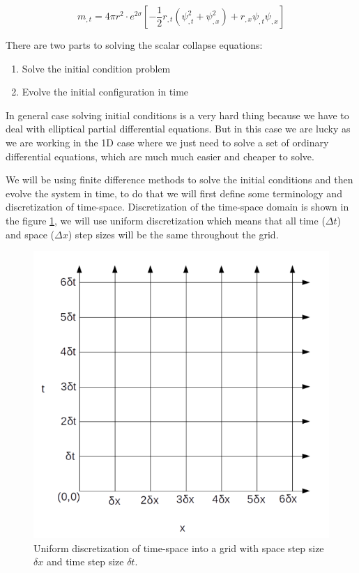 \begin{equation}
    m_{, t}=4 \pi r^{2} \cdot e^{2 \sigma}\left[-\frac{1}{2} r_{, t}\left(\psi_{, t}^{2}+\psi_{, x}^{2}\right)+r_{, x} \psi_{, t} \psi_{, x}\right]
    \label{eqn:m_chap3}
\end{equation}

There are two parts to solving the scalar collapse equations:
\begin{enumerate}
    \item Solve the initial condition problem
    \item Evolve the initial configuration in time
\end{enumerate}

In general case solving initial conditions is a very hard thing because we have to deal with elliptical partial differential equations. But in this case we are lucky as we are working in the 1D case where we just need to solve a set of ordinary differential equations, which are much much easier and cheaper to solve.

We will be using finite difference methods to solve the initial conditions and then evolve the system in time, to do that we will first define some terminology and discretization of time-space.  Discretization of the time-space domain is shown in the figure \ref{fig:grid}, we will use uniform discretization which means that all time ($\Delta t$) and space ($\Delta x$) step sizes will be the same throughout the grid.



\begin{figure}[hbt!]
    \centering
    \includegraphics[width=\textwidth]{images/grid.png}
    \caption{Uniform discretization of time-space into a grid with space step size $\delta x$ and time step size $\delta t$.}
    \label{fig:grid}
\end{figure}

